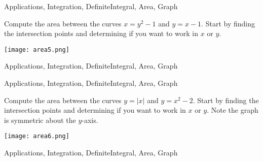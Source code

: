 \begin{tagblock}{Applications, Integration, DefiniteIntegral, Area, Graph}
\begin{question}
	


Compute the area between the curves $x=y^2-1$ and $y=x-1$.  Start by finding the intersection points and determining if you want to work in $x$ or $y$.  

\texttt{[image: area5.png]} 

    
\begin{tags}
       Applications, Integration, DefiniteIntegral, Area, Graph
\end{tags}
    
\begin{diary}
\end{diary}
	
\begin{solution}

\end{solution}
	
\end{question}

\end{tagblock}

\begin{tagblock}{Applications, Integration, DefiniteIntegral, Area, Graph}
\begin{question}
	


Compute the area between the curves $y=|x|$ and $y=x^2-2$.   Start by finding the intersection points and determining if you want to work in $x$ or $y$.  Note the graph is symmetric about the $y$-axis.

\texttt{[image: area6.png]} 

    
\begin{tags}
       Applications, Integration, DefiniteIntegral, Area, Graph
\end{tags}
    
\begin{diary}
\end{diary}
	
\begin{solution}

\end{solution}
	
\end{question}

\end{tagblock}

